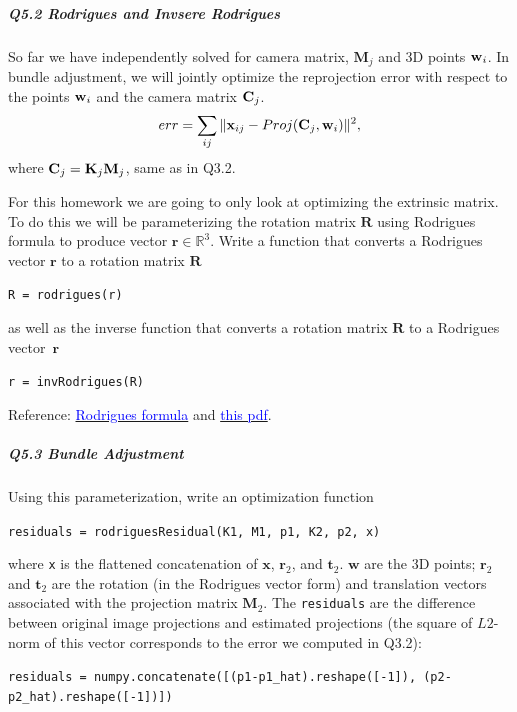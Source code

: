 \subparagraph*{Q5.2 Rodrigues and Invsere Rodrigues}
So far we have independently solved for camera matrix, $\mathbf{M}_j$ and 3D points ${\bf w}_i$. In bundle adjustment, we will jointly optimize the reprojection error with respect to the points ${\bf w}_i$ and the camera matrix ${\bf C}_j$.
$$
err = \sum_{ij} \|{\bf x}_{ij} - Proj(\mathbf{C}_j, {\bf w}_i)\|^2,
$$
where ${\bf C}_j = \mathbf{K}_j \mathbf{M}_j$, same as in Q3.2.

For this homework we are going to only look at optimizing the extrinsic matrix. To do this we will be parameterizing the rotation matrix $\mathbf{R}$ using Rodrigues formula to produce vector $\mathbf{r} \in \mathbb{R}^3$. Write a function that converts a Rodrigues vector $\mathbf{r}$ to a rotation matrix $\mathbf{R}$
\begin{center}
\texttt{R = rodrigues(r)}
\end{center}
as well as the inverse function that converts a rotation matrix $\mathbf{R}$ to a Rodrigues vector~$\mathbf{r}$
\begin{center}
\texttt{r = invRodrigues(R)}
\end{center}
Reference: \href{https://en.wikipedia.org/wiki/Rodrigues\%27\_formula}{\textcolor{blue}{Rodrigues formula}} and \href{https://www2.cs.duke.edu/courses/fall13/compsci527/notes/rodrigues.pdf}{\textcolor{blue}{this pdf}}.


\begin{your_solution}[title=Q5.2,height=5.5cm,width=\linewidth]
\end{your_solution}

\subparagraph*{Q5.3 Bundle Adjustment}

Using this parameterization, write an optimization function
\begin{center}
\texttt{residuals = rodriguesResidual(K1, M1, p1, K2, p2, x)}
\end{center}
where \texttt{x} is the flattened concatenation of $\mathbf{x}$, $\mathbf{r}_2$, and $\mathbf{t}_2$. $\mathbf{w}$ are the 3D points; $\mathbf{r}_2$ and $\mathbf{t}_2$ are the rotation (in the Rodrigues vector form) and translation vectors associated with the projection matrix $\mathbf{M}_2$. The \texttt{residuals} are the difference between original image projections and estimated projections (the square of $L2$-norm of this vector corresponds to the error we computed in Q3.2):
\begin{center}
\texttt{residuals = numpy.concatenate([(p1-p1\_hat).reshape([-1]), (p2-p2\_hat).reshape([-1])])}
\end{center}

